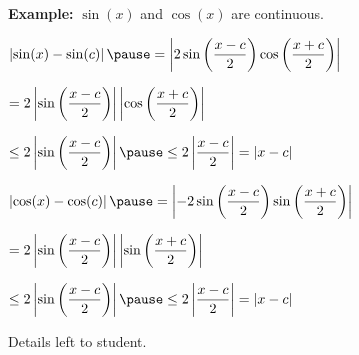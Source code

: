 \documentclass[10pt,aspectratio=169]{beamer}
\begin{document}
\begin{frame}

\textbf{Example:}
$\sin(x)$ and $\cos(x)$ are continuous.

\pause
\medskip

$\displaystyle
\abs{\sin(x)-\sin(c)}
\pause
=
\abs{
2 \sin \left( \frac{x-c}{2} \right) \cos \left( \frac{x+c}{2} \right)
}
$

\pause
\medskip

\qquad$\displaystyle
=
2
\left\lvert { \sin \left( \frac{x-c}{2} \right) } \right\rvert
\left\lvert { \cos \left( \frac{x+c}{2} \right) } \right\rvert
$

\pause
\medskip

\qquad$\displaystyle
\leq
2
\abs{ \sin \left( \frac{x-c}{2} \right) }
\pause
\leq
2
\abs{ \frac{x-c}{2} }
= \abs{x-c}
$

\pause
\medskip

$\displaystyle
\abs{\cos(x)-\cos(c)}
\pause
=
\abs{
-2 \sin \left( \frac{x-c}{2} \right) \sin \left( \frac{x+c}{2} \right)
}
$

\pause
\medskip

\qquad$\displaystyle
=
2
\left\lvert { \sin \left( \frac{x-c}{2} \right) } \right\rvert
\left\lvert { \sin \left( \frac{x+c}{2} \right) } \right\rvert
$

\pause
\medskip

\qquad$\displaystyle
\leq
2
\abs{ \sin \left( \frac{x-c}{2} \right) }
\pause
\leq
2
\abs{ \frac{x-c}{2} }
= \abs{x-c}
$

\pause
\medskip

Details left to student.

\end{frame}
\end{document}
